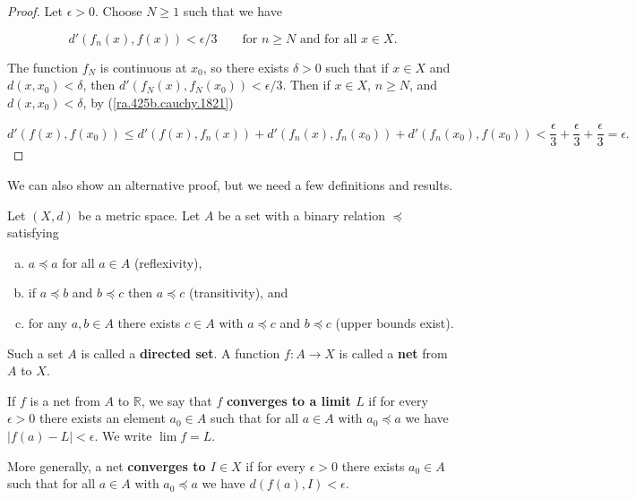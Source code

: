 \begin{proof}

Let \(\epsilon > 0\). Choose \(N \geq 1\) such that we have 

\begin{equation}\label{ra.425b.cauchy.1821}
d'(f_n(x), f(x)) < \epsilon/3 \qquad \text{for } n \geq N \text{ and for all } x \in X.
\end{equation} 

The function \(f_N\) is continuous at \(x_0\), so there exists \(\delta >0 \) such that if \(x \in X\) and \(d(x, x_0) < \delta\), then \(d'(f_N(x), f_N(x_0)) < \epsilon/3\). Then if \(x \in X\), \( n \geq N\), and \(d(x, x_0) < \delta\), by (\ref{ra.425b.cauchy.1821})

\[
d'(f(x), f(x_0)) \leq d'(f(x), f_n(x)) + d' (f_n(x), f_n(x_0)) + d' (f_n(x_0), f(x_0)) < \frac{\epsilon}{3} + \frac{\epsilon}{3}  + \frac{\epsilon}{3}  = \epsilon.
\]

\end{proof}

We can also show an alternative proof, but we need a few definitions and results.

\begin{definition}\label{ra.defn.directed.set.net}

Let \((X,d)\) be a metric space. Let \(A\) be a set with a binary relation \(\preceq\) satisfying

\begin{enumerate}[(a)]

\item \(a \preceq a\) for all \(a \in A\) (reflexivity),

\item if \(a \preceq b\) and \(b \preceq c\) then \(a \preceq c\) (transitivity), and

\item for any \(a, b \in A\) there exists \(c \in A\) with \(a \preceq c \) and \(b \preceq c\) (upper bounds exist).

\end{enumerate}

Such a set \(A\) is called a \textbf{directed set}. A function \(f: A \to X\) is called a \textbf{net} from \(A\) to \(X\).

If \(f\) is a net from \(A\) to \(\mathbb{R}\), we say that \(f\) \textbf{converges to a limit \(L\)} if for every \(\epsilon > 0\) there exists an element \(a_0 \in A\) such that for all \(a \in A\) with \(a_0 \preceq a\) we have \(|f(a) - L| < \epsilon\). We write \(\lim f =L\).

More generally, a net \textbf{converges to \(I \in X\)} if for every \(\epsilon > 0\) there exists \(a_0 \in A\) such that for all \(a \in A\) with \(a_0 \preceq a\) we have \(d(f(a) ,I) < \epsilon\).

\end{definition}


